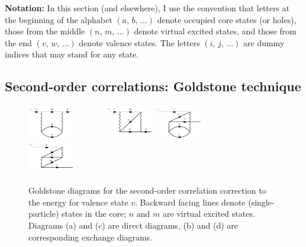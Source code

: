 \documentclass[10pt,twocolumn,a4paper]{article}%
\begin{document}
{\bf Notation:} In this section (and elsewhere), I use the convention that letters at the beginning of the alphabet {${(a,\,b,\,...)}$} denote occupied core states (or holes),
those from the middle {${(n,\,m,\,...)}$} denote virtual excited states, and
those from the end {${(v,\,w,\,...)}$} denote valence states.
The letters {${(i,\,j,\,...)}$} are dummy indices that may stand for any state.



\subsection{Second-order correlations: Goldstone technique}

\begin{figure}%
\centering\tiny
\includegraphics[width=0.185\textwidth]{img/Sigma/Sigma2_a}~~~~~~~
\includegraphics[width=0.185\textwidth]{img/Sigma/Sigma2_b}
\includegraphics[width=0.185\textwidth]{img/Sigma/Sigma2_c}~~~~~~~
\includegraphics[width=0.185\textwidth]{img/Sigma/Sigma2_d}
\caption{\small Goldstone diagrams for the second-order correlation correction to the energy for valence state $v$. Backward facing lines denote (single-particle) states in the core; $n$ and $m$ are virtual excited states. Diagrams (a) and (c) are direct diagrams, (b) and (d) are corresponding exchange diagrams.\label{fig:Sigma2}}
\end{figure}
\end{document}
